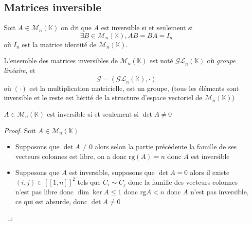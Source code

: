 \documentclass[11pt,colorlinks]{book}
\theoremstyle{mytheoremstyle}
\theoremstyle{mytheoremstyle}
\theoremstyle{mytheoremstyle}
\theoremstyle{mytheoremstyle}
\theoremstyle{mytheoremstyle}
\theoremstyle{mytheoremstyle}
\theoremstyle{mytheoremstyle}
\theoremstyle{mytheoremstyle}
\theoremstyle{myproblemstyle}
\def\mbb#1{\mathbb{#1}}
\def\bK{\mbb{K}}
\renewcommand{\equiv}{\sim}
\begin{document}
\subsection{Matrices inversible}
\begin{definition}
  Soit $A \in \mathcal{M}_n(\bK)$ on dit que $A$ est inversible si et seulement si 
  \begin{equation*}
    \exists B \in \mathcal{M}_n(\bK), AB = BA = I_n
  \end{equation*}
  où $I_n$ est la matrice identité de $\mathcal{M}_n(\bK)$.\newline

  L'ensemble des matrices inversibles de $\mathcal{M}_n(\bK)$ est noté $\mathcal{GL}_n(\bK)$ où \textit{groupe linéaire}, et 
  \begin{equation*}
    \mathcal G = (\mathcal{GL}_n(\bK),\cdot)
  \end{equation*}
  où $(\cdot)$ est la multiplication matricielle, est un groupe, (tous les éléments sont inversible et le reste est hérité de la structure d'espace vectoriel de $\mathcal{M}_n(\bK)$)
\end{definition}
\begin{prop}
  $A \in \mathcal{M}_n(\bK)$ est inversible si et seulement si $\det A \not= 0$
  \begin{proof}
    Soit $A \in \mathcal{M}_n(\bK)$
    \begin{itemize}
      \item Supposons que $\det A \not= 0$ alors selon la partie précédente la famille de ses vecteurs colonnes est libre, on a donc $\text{rg}(A) = n$ donc $A$ est inversible
      \item Supposons que $A$ est inversible, supposons que $\det A = 0$ alors il existe $(i,j) \in [\![1,n]\!]^2$ tels que $C_i \equiv C_j$ donc la famille 
      des vecteurs colonnes n'est pas libre donc $\dim \ker A \leq 1$ donc $\text{rg} A < n$ donc $A$ n'est pas inversible, ce qui est absurde, donc $\det A \not= 0$   
    \end{itemize}
  \end{proof}
\end{prop}
\end{document}

